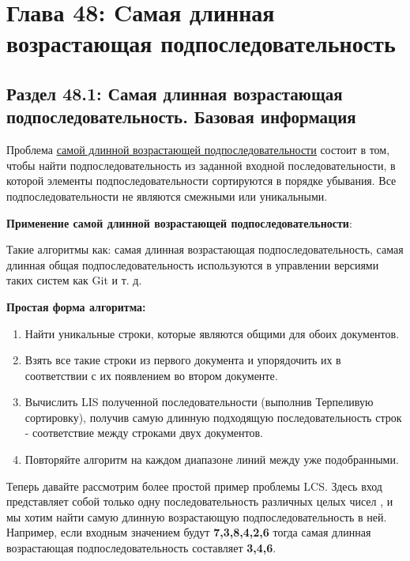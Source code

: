 \newpage
\chapter*{Глава 48: Cамая длинная возрастающая подпоследовательность}
\section*{Раздел 48.1: Самая длинная возрастающая подпоследовательность. Базовая
информация}
Проблема \href{https://en.wikipedia.org/wiki/Longest_increasing_subsequence}{\underline{самой длинной возрастающей подпоследовательности}} состоит в
том, чтобы найти подпоследовательность из заданной входной
последовательности, в которой элементы подпоследовательности
сортируются в порядке убывания. Все подпоследовательности не являются
смежными или уникальными.
\vspace{\baselineskip}

\textbf{Применение самой длинной возрастающей подпоследовательности}:
\vspace{\baselineskip}

Такие алгоритмы как: самая длинная возрастающая подпоследовательность,
самая длинная общая подпоследовательность используются в управлении
версиями таких систем как Git и т. д.
\vspace{\baselineskip}

\textbf{Простая форма алгоритма:}
\vspace{\baselineskip}
\begin{enumerate}
    \item Найти уникальные строки, которые являются общими для обоих
документов.
    \item Взять все такие строки из первого документа и упорядочить их в
соответствии с их появлением во втором документе.
    \item Вычислить LIS полученной последовательности (выполнив Терпеливую
сортировку), получив самую длинную подходящую последовательность
строк - соответствие между строками двух документов.
    \item Повторяйте алгоритм на каждом диапазоне линий между уже
подобранными.
\end{enumerate}
Теперь давайте рассмотрим более простой пример проблемы LCS. Здесь
вход представляет собой только одну последовательность различных целых
чисел , и мы хотим найти самую длинную возрастающую
подпоследовательность в ней. Например, если входным значением будут
\textbf{7,3,8,4,2,6} тогда самая длинная возрастающая подпоследовательность
составляет \textbf{3,4,6}.
\vspace{\baselineskip}

